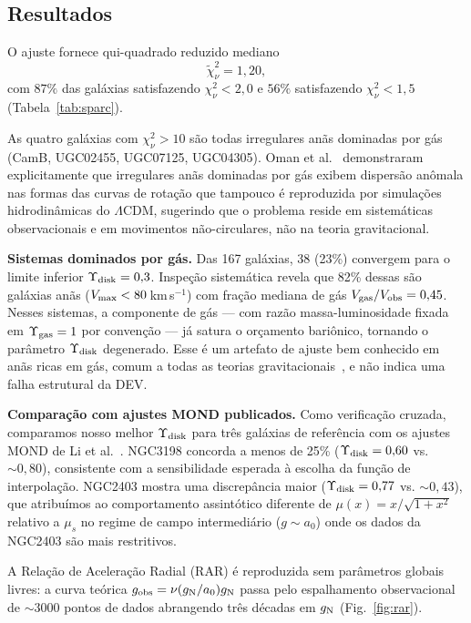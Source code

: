\documentclass[aps,prd,twocolumn,showpacs,superscriptaddress]{revtex4-2}
\newcommand{\aO}{a_0}
\newcommand{\gN}{g_{\rm N}}
\newcommand{\gobs}{g_{\rm obs}}
\newcommand{\LCDM}{$\Lambda$CDM}
\begin{document}
\subsection{Resultados}

O ajuste fornece qui-quadrado reduzido mediano
\begin{equation}
  \widetilde\chi^2_\nu = 1{,}20,
\end{equation}
com $87\%$ das galáxias satisfazendo $\chi^2_\nu < 2{,}0$ e
$56\%$ satisfazendo $\chi^2_\nu < 1{,}5$ (Tabela~\ref{tab:sparc}).

As quatro galáxias com $\chi^2_\nu > 10$ são todas irregulares anãs
dominadas por gás (CamB, UGC02455, UGC07125, UGC04305).
Oman et al.~\cite{Oman2015} demonstraram explicitamente que
irregulares anãs dominadas por gás exibem dispersão anômala nas
formas das curvas de rotação que tampouco é reproduzida por
simulações hidrodinâmicas do \LCDM{}, sugerindo que o problema
reside em sistemáticas observacionais e em movimentos não-circulares,
não na teoria gravitacional.

\textbf{Sistemas dominados por gás.}
Das 167 galáxias, 38 (23\%) convergem para o limite inferior
$\Upsilon_{\rm disk} = 0{,}3$.
Inspeção sistemática revela que 82\% dessas são galáxias anãs
($V_{\rm max} < 80$\,km\,s$^{-1}$) com fração mediana de gás
$V_{\rm gas}/V_{\rm obs} = 0{,}45$.
Nesses sistemas, a componente de gás — com razão massa-luminosidade
fixada em $\Upsilon_{\rm gas} = 1$ por convenção — já satura o
orçamento bariônico, tornando o parâmetro $\Upsilon_{\rm disk}$
degenerado. Esse é um artefato de ajuste bem conhecido em anãs
ricas em gás, comum a todas as teorias gravitacionais~\cite{Oman2015,Li2018},
e não indica uma falha estrutural da DEV.

\textbf{Comparação com ajustes MOND publicados.}
Como verificação cruzada, comparamos nosso melhor $\Upsilon_{\rm disk}$
para três galáxias de referência com os ajustes MOND de
Li et al.~\cite{Li2018}.
NGC3198 concorda a menos de 25\% ($\Upsilon_{\rm disk} = 0{,}60$
vs. $\sim\!0{,}80$), consistente com a sensibilidade esperada à
escolha da função de interpolação.
NGC2403 mostra uma discrepância maior ($\Upsilon_{\rm disk} = 0{,}77$
vs. $\sim\!0{,}43$), que atribuímos ao comportamento assintótico
diferente de $\mu(x) = x/\sqrt{1+x^2}$ relativo a $\mu_s$ no
regime de campo intermediário ($g \sim \aO$) onde os dados da
NGC2403 são mais restritivos.

A Relação de Aceleração Radial (RAR) é reproduzida sem parâmetros
globais livres: a curva teórica $\gobs = \nu(\gN/\aO)\gN$ passa
pelo espalhamento observacional de $\sim 3000$ pontos de dados
abrangendo três décadas em $\gN$ (Fig.~\ref{fig:rar}).
\end{document}
